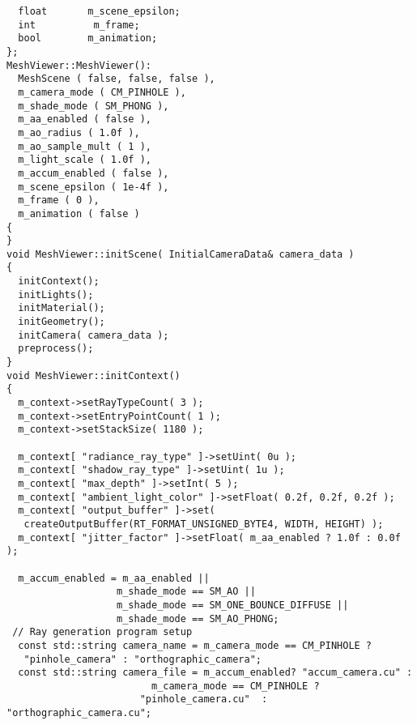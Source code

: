 \begin{verbatim}
  float       m_scene_epsilon;
  int          m_frame;
  bool        m_animation;
};
MeshViewer::MeshViewer():
  MeshScene ( false, false, false ),
  m_camera_mode ( CM_PINHOLE ),
  m_shade_mode ( SM_PHONG ),
  m_aa_enabled ( false ),
  m_ao_radius ( 1.0f ),
  m_ao_sample_mult ( 1 ),
  m_light_scale ( 1.0f ),
  m_accum_enabled ( false ),
  m_scene_epsilon ( 1e-4f ),
  m_frame ( 0 ),
  m_animation ( false )
{
}
void MeshViewer::initScene( InitialCameraData& camera_data )
{
  initContext();
  initLights();
  initMaterial();
  initGeometry();
  initCamera( camera_data );
  preprocess();
}
void MeshViewer::initContext()
{
  m_context->setRayTypeCount( 3 );
  m_context->setEntryPointCount( 1 );
  m_context->setStackSize( 1180 );

  m_context[ "radiance_ray_type" ]->setUint( 0u );
  m_context[ "shadow_ray_type" ]->setUint( 1u );
  m_context[ "max_depth" ]->setInt( 5 );
  m_context[ "ambient_light_color" ]->setFloat( 0.2f, 0.2f, 0.2f );
  m_context[ "output_buffer" ]->set(
   createOutputBuffer(RT_FORMAT_UNSIGNED_BYTE4, WIDTH, HEIGHT) );
  m_context[ "jitter_factor" ]->setFloat( m_aa_enabled ? 1.0f : 0.0f );
  
  m_accum_enabled = m_aa_enabled ||
                   m_shade_mode == SM_AO ||
                   m_shade_mode == SM_ONE_BOUNCE_DIFFUSE ||
                   m_shade_mode == SM_AO_PHONG;
 // Ray generation program setup
  const std::string camera_name = m_camera_mode == CM_PINHOLE ?
   "pinhole_camera" : "orthographic_camera"; 
  const std::string camera_file = m_accum_enabled? "accum_camera.cu" :
                         m_camera_mode == CM_PINHOLE ?
                       "pinhole_camera.cu"  : "orthographic_camera.cu";


\end{verbatim}
